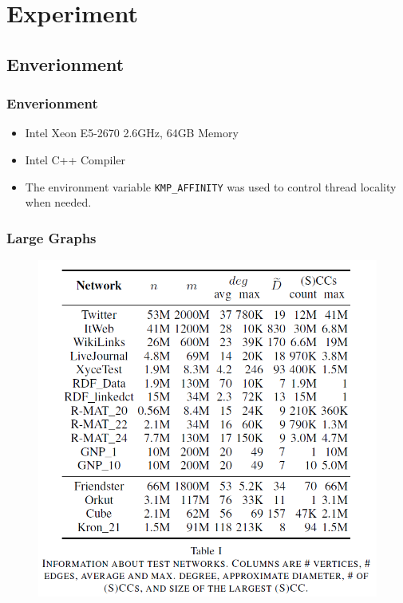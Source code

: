 \section{Experiment}

\subsection{Enverionment}
\begin{frame}
	\frametitle{Enverionment}
	\begin{itemize}
		\item Intel Xeon E5-2670 2.6GHz, 64GB Memory
		\item Intel C++ Compiler
		\item The environment variable \texttt{KMP\_AFFINITY} was used 
			to control thread locality when needed.
	\end{itemize}
\end{frame}

\begin{frame}
	\frametitle{Large Graphs}
	\begin{figure}
		\includegraphics[scale=0.35]{figure/fig-test-graph.png}
	\end{figure}
\end{frame}

